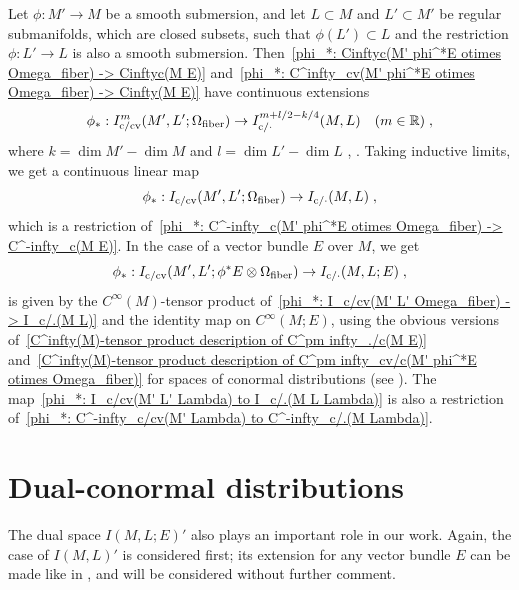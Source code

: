 \documentclass{memo-l}
\theoremstyle{plain}
\theoremstyle{definition}
\theoremstyle{remark}
\newcommand{\R}{\mathbb{R}}
\newcommand{\fiber}{{\text{\rm fiber}}}
\newcommand{\co}{{\text{\rm c}}}
\newcommand{\cv}{{\text{\rm cv}}}
\numberwithin{section}{chapter}
\numberwithin{equation}{section}%
\begin{document}
Let $\phi:M'\to M$ be a smooth submersion, and let $L\subset M$ and $L'\subset M'$ be regular submanifolds, which are closed subsets, such that $\phi(L')\subset L$ and the restriction $\phi:L'\to L$ is also a smooth submersion. Then~\eqref{phi_*: Cinftyc(M' phi^*E otimes Omega_fiber) -> Cinftyc(M E)} and~\eqref{phi_*: C^infty_cv(M' phi^*E otimes Omega_fiber) -> Cinfty(M E)} have continuous extensions
\begin{equation}\label{phi_*: I^m_c(M' L' Omega_fiber) -> I^m+l/2-k/4_c(M L)}
\phi_*:I^m_{\co/\cv}(M',L';\Omega_\fiber)\to I^{m+l/2-k/4}_{\co/{\cdot}}(M,L)\quad(m\in\R)\;,
\end{equation}
where $k=\dim M'-\dim M$ and $l=\dim L'-\dim L$ \cite[Theorem~5.3.6]{Simanca1990}, \cite[Proposition~6.7.2]{Melrose1996}. Taking inductive limits, we get a continuous linear map
\begin{equation}\label{phi_*: I_c/cv(M' L' Omega_fiber) -> I_c/.(M L)}
\phi_*:I_{\co/\cv}(M',L';\Omega_\fiber)\to I_{\co/{\cdot}}(M,L)\;,
\end{equation}
which is a restriction of~\eqref{phi_*: C^-infty_c(M' phi^*E otimes Omega_fiber) -> C^-infty_c(M E)}. In the case of a vector bundle $E$ over $M$, we get
\begin{equation}\label{phi_*: I_c/cv(M' L' phi^*E otimes Omega_fiber) -> I_c/.(M L E)}
\phi_*:I_{\co/\cv}(M',L';\phi^*E\otimes\Omega_\fiber)\to I_{\co/{\cdot}}(M,L;E)\;,
\end{equation}
is given by the $C^\infty(M)$-tensor product of~\eqref{phi_*: I_c/cv(M' L' Omega_fiber) -> I_c/.(M L)} and the identity map on $C^\infty(M;E)$, using the obvious versions of~\eqref{C^infty(M)-tensor product description of C^pm infty_./c(M E)} and~\eqref{C^infty(M)-tensor product description of C^pm infty_cv/c(M' phi^*E otimes Omega_fiber)} for spaces of conormal distributions (see ). The map~\eqref{phi_*: I_c/cv(M' L' Lambda) to I_c/.(M L Lambda)} is also a restriction of~\eqref{phi_*: C^-infty_c/cv(M' Lambda) to C^-infty_c/.(M Lambda)}.



\section{Dual-conormal distributions}\label{s: dual-conormal distribs}

The dual space $I(M,L;E)'$ \cite[Chapter~6]{Melrose1996} also plays an important role in our work. Again, the case of $I(M,L)'$ is considered first; its extension for any vector bundle $E$ can be made like in , and will be considered without further comment.
\end{document}
